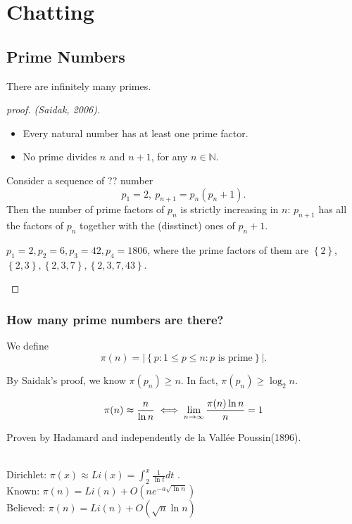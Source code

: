 \chapter{Chatting}
\section{Prime Numbers}
\begin{theorem}
  There are infinitely many primes.
\end{theorem}
\begin{proof}[proof. (Saidak, 2006)]
\vphantom{ }
\begin{itemize}
  \item Every natural number has at least one prime factor.
  \item No prime divides \(n\) and \(n+1\), for any \(n \in \mathbb{N} \).   
\end{itemize}
Consider a sequence of ?? number 
\[
  p_1 = 2, \ p_{n+1} = p_n(p_n + 1).
\]
Then the number of prime factors of \(p_n\) is strictly increasing in \(n\): \(p_{n+1}\) has all the factors of \(p_n\) together with the (disstinct) ones of \(p_n + 1\). 
\begin{eg}
  \(p_1=2, p_2=6, p_3=42,p_4=1806 \), where the prime factors of them are \(\left\{ 2 \right\}\), \(\left\{ 2,3 \right\}, \left\{ 2,3,7 \right\}, \left\{ 2,3,7,43 \right\} \).
\end{eg}     
\end{proof}

\subsection{How many prime numbers are there?}
\begin{definition}
  We define 
  \[
    \pi (n) = \left\vert \left\{ p: 1 \le p \le n : p \text{ is prime}\right\}  \right\vert. 
  \]
\end{definition}
\begin{note}
  By Saidak's proof, we know \(\pi (p_n) \ge n\). In fact, \(\pi (p_n) \ge \log _2 n\). 
\end{note}
\begin{theorem}
  \[
    \pi (n) \thickapprox \frac{n}{\ln n} \iff \lim_{n \to \infty} \frac{\pi (n) \ln n}{n} = 1 
  \]
\end{theorem}
\begin{note}
  Proven by Hadamard and independently de la Vallée Poussin(1896).
\end{note}
\begin{theorem}
  \vphantom{text} \\
  Dirichlet: \(\pi (x) \approx Li(x) = \int_2^x \frac{1}{\ln t} dt\) . \\ 
  Known: \(\pi (n) = Li(n) + O\left( n e^{-a \sqrt{\ln n} } \right) \) \\
  Believed: \(\pi (n) = Li(n) + O\left( \sqrt{n} \ln n  \right) \)  
\end{theorem}


